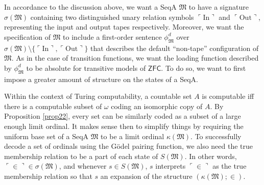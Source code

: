 \documentclass[12pt]{article}
\numberwithin{equation}{section}
\begin{document}
In accordance to the discussion above, we want a SeqA $\mathfrak{M}$ to have a signature $\sigma(\mathfrak{M})$ containing two distinguished unary relation symbols $\ulcorner \mathrm{In} \urcorner$ and $\ulcorner \mathrm{Out} \urcorner$, representing the input and output tapes respectively. Moreover, we want the specification of $\mathfrak{M}$ to include a first-order sentence $\phi^d_{\mathfrak{M}}$ over $\sigma(\mathfrak{M}) \setminus \{\ulcorner \mathrm{In} \urcorner, \ulcorner \mathrm{Out} \urcorner\}$ that describes the default ``non-tape'' configuration of $\mathfrak{M}$. As in the case of transition functions, we want the loading function described by $\phi^d_{\mathfrak{M}}$ to be absolute for transitive models of $\mathsf{ZFC}$. To do so, we want to first impose a greater amount of structure on the states of a SeqA.

Within the context of Turing computability, a countable set $A$ is computable iff there is a computable subset of $\omega$ coding an isomorphic copy of $A$. By Proposition \ref{prop22}, every set can be similarly coded as a subset of a large enough limit ordinal. It makes sense then to simplify things by requiring the uniform base set of a SeqA $\mathfrak{M}$ to be a limit ordinal $\kappa(\mathfrak{M})$. To successfully decode a set of ordinals using the G\"{o}del pairing function, we also need the true membership relation to be a part of each state of $S(\mathfrak{M})$. In other words, $\ulcorner \in \urcorner \in \sigma(\mathfrak{M})$, and whenever $s \in S(\mathfrak{M})$, $s$ interprets $\ulcorner \in \urcorner$ as the true membership relation so that $s$ an expansion of the structure $(\kappa(\mathfrak{M}); \in)$.
\end{document}
